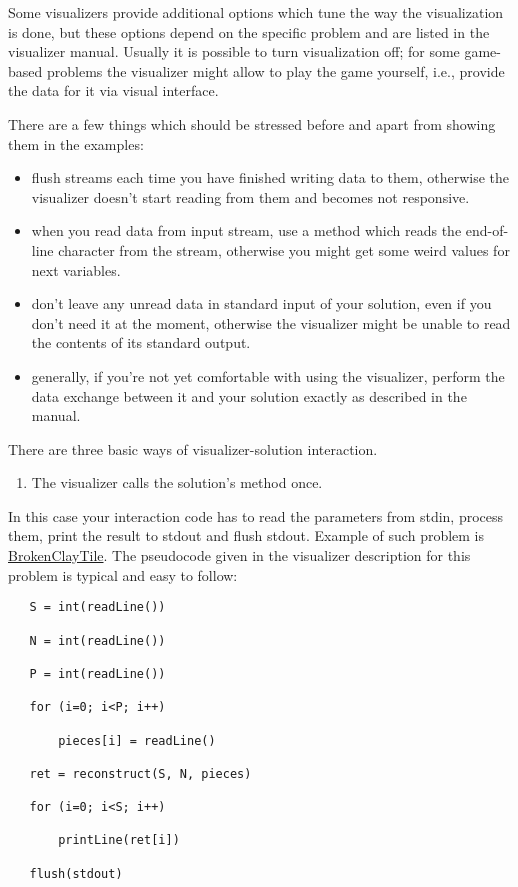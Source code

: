 Some visualizers provide additional options which tune the way the
visualization is done, but these options depend on the specific problem
and are listed in the visualizer manual. Usually it is possible to turn
visualization off; for some game-based problems the visualizer might
allow to play the game yourself, i.e., provide the data for it via
visual interface.

There are a few things which should be stressed before and apart from
showing them in the examples:

\begin{itemize}
\item
  flush streams each time you have finished writing data to them,
  otherwise the visualizer doesn't start reading from them and becomes
  not responsive.
\item
  when you read data from input stream, use a method which reads the
  end-of-line character from the stream, otherwise you might get some
  weird values for next variables.
\item
  don't leave any unread data in standard input of your solution, even
  if you don't need it at the moment, otherwise the visualizer might be
  unable to read the contents of its standard output.
\item
  generally, if you're not yet comfortable with using the visualizer,
  perform the data exchange between it and your solution exactly as
  described in the manual.
\end{itemize}

There are three basic ways of visualizer-solution interaction.

\begin{enumerate}
\def\labelenumi{\arabic{enumi}.}
\tightlist
\item
  The visualizer calls the solution's method once.
\end{enumerate}

In this case your interaction code has to read the parameters from
stdin, process them, print the result to stdout and flush stdout.
Example of such problem is
\href{http://www.topcoder.com/longcontest/?module=ViewProblemStatement\&rd=14209\&pm=10756}{BrokenClayTile}.
The pseudocode given in the visualizer description for this problem is
typical and easy to follow:

\begin{verbatim}
   S = int(readLine())

   N = int(readLine())

   P = int(readLine())

   for (i=0; i<P; i++)

       pieces[i] = readLine()

   ret = reconstruct(S, N, pieces)

   for (i=0; i<S; i++)

       printLine(ret[i])

   flush(stdout)
\end{verbatim}

